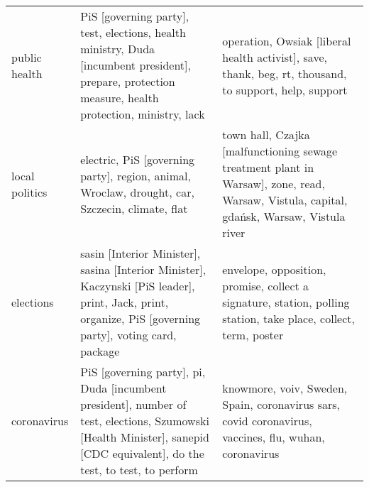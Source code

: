 \begin{tabular}{p{2cm}p{6cm}p{6cm}}
           public health &                               PiS [governing party], test, elections, health ministry, Duda [incumbent president], prepare, protection measure, health protection, ministry, lack &                                                                                           operation, Owsiak [liberal health activist], save, thank, beg, rt, thousand, to support, help, support \\
          local politics &                                                                                   electric, PiS [governing party], region, animal, Wroclaw, drought, car, Szczecin, climate, flat &                                                         town hall, Czajka [malfunctioning sewage treatment plant in Warsaw], zone, read, Warsaw, Vistula, capital, gdańsk, Warsaw, Vistula river \\
               elections &                          sasin [Interior Minister], sasina [Interior Minister], Kaczynski [PiS leader], print, Jack, print, organize, PiS [governing party], voting card, package &                                                                                  envelope, opposition, promise, collect a signature, station, polling station, take place, collect, term, poster \\
             coronavirus &         PiS [governing party], pi, Duda [incumbent president], number of test, elections, Szumowski [Health Minister], sanepid [CDC equivalent], do the test, to test, to perform &                                                                                            knowmore, voiv, Sweden, Spain, coronavirus sars, covid coronavirus, vaccines, flu, wuhan, coronavirus \\
\bottomrule
\end{tabular}
